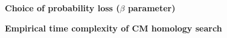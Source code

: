 \documentclass[landscape]{slides}
\begin{document}
\begin{slide}
\begin{center}
\textbf{Choice of probability loss ($\beta$ parameter)}
\end{center}

\small



\vfill
\end{slide}

\begin{slide}
\begin{center}
\textbf{Empirical time complexity of CM homology search}
\end{center}


\vfill
\end{slide}
\end{document}
